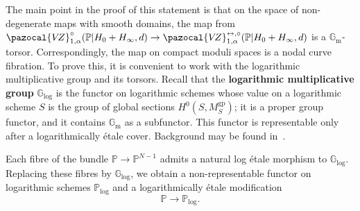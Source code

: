 \documentclass[11pt]{amsart}
\newcommand{\VZ}{\pazocal{V\!Z}}
\renewcommand{\to}{\rightarrow}
\newcommand{\Gm}{\mathbb{G}_{\text{m}}}
\theoremstyle{definition}
\theoremstyle{definition}
\begin{document}
The main point in the proof of this statement is that on the space of non-degenerate maps with smooth domains, the map from $\VZ^\circ_{1,\alpha}(\mathbb P|H_0+H_\infty,d)\to \VZ^{\leftrightarrow,\circ}_{1,\alpha}(\mathbb P|H_0+H_\infty,d)$ is a $\mathbb G_{\operatorname{m}}$-torsor. Correspondingly, the map on compact moduli spaces is a nodal curve fibration. To prove this, it is convenient to work with the logarithmic multiplicative group and its torsors. Recall that the \textbf{logarithmic multiplicative group} $\mathbb G_{\mathrm{log}}$ is the functor on logarithmic schemes whose value on a logarithmic scheme $S$ is the group of global sections $H^0(S,M_S^{\mathrm{gp}})$; it is a proper group functor, and it contains $\Gm$ as a subfunctor. This functor is representable only after a logarithmically \'etale cover. Background may be found in~\cite{MW17,RW19}.

Each fibre of the bundle $\mathbb P \to \mathbb P^{N-1}$ admits a natural log \'etale morphism to $\mathbb G_{\mathrm{log}}$. Replacing these fibres by $\mathbb G_{\mathrm{log}}$, we obtain a non-representable functor on logarithmic schemes $\mathbb P_{\mathrm{log}}$ and a logarithmically \'etale modification
\[
\mathbb P\to \mathbb P_{\mathrm{log}}.
\]

\end{document}
